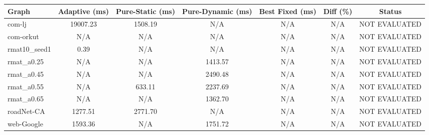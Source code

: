 \begin{tabular}{lcccccc}
\hline
Graph & Adaptive (ms) & Pure-Static (ms) & Pure-Dynamic (ms) & Best Fixed (ms) & Diff (\%) & Status \\
\hline
com-lj & 19007.23 & 1508.19 & N/A & N/A & N/A & NOT EVALUATED \\
com-orkut & N/A & N/A & N/A & N/A & N/A & NOT EVALUATED \\
rmat10_seed1 & 0.39 & N/A & N/A & N/A & N/A & NOT EVALUATED \\
rmat_a0.25 & N/A & N/A & 1413.57 & N/A & N/A & NOT EVALUATED \\
rmat_a0.45 & N/A & N/A & 2490.48 & N/A & N/A & NOT EVALUATED \\
rmat_a0.55 & N/A & 633.11 & 2237.69 & N/A & N/A & NOT EVALUATED \\
rmat_a0.65 & N/A & N/A & 1362.70 & N/A & N/A & NOT EVALUATED \\
roadNet-CA & 1277.51 & 2771.70 & N/A & N/A & N/A & NOT EVALUATED \\
web-Google & 1593.36 & N/A & 1751.72 & N/A & N/A & NOT EVALUATED \\
\hline
\end{tabular}
